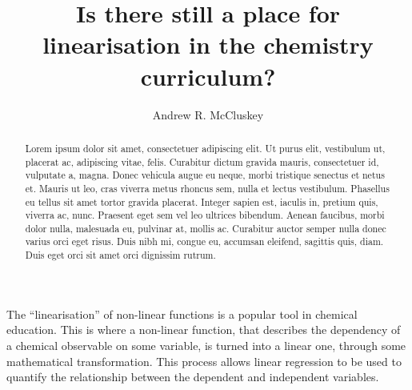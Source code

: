 \documentclass[reprint,superscriptaddress,nobibnotes,amsmath,amssymb]{revtex4-2}
\begin{document}
\title{Is there still a place for linearisation in the chemistry curriculum?}

\author{Andrew R. McCluskey}

\begin{abstract}
    Lorem ipsum dolor sit amet, consectetuer adipiscing elit.
    Ut purus elit, vestibulum ut, placerat ac, adipiscing vitae, felis.
    Curabitur dictum gravida mauris, consectetuer id, vulputate a, magna.
    Donec vehicula augue eu neque, morbi tristique senectus et netus et.
    Mauris ut leo, cras viverra metus rhoncus sem, nulla et lectus vestibulum.
    Phasellus eu tellus sit amet tortor gravida placerat.
    Integer sapien est, iaculis in, pretium quis, viverra ac, nunc.
    Praesent eget sem vel leo ultrices bibendum.
    Aenean faucibus, morbi dolor nulla, malesuada eu, pulvinar at, mollis ac.
    Curabitur auctor semper nulla donec varius orci eget risus.
    Duis nibh mi, congue eu, accumsan eleifend, sagittis quis, diam.
    Duis eget orci sit amet orci dignissim rutrum.
\end{abstract}

\maketitle 

The ``linearisation'' of non-linear functions is a popular tool in chemical education. 
This is where a non-linear function, that describes the dependency of a chemical observable on some variable, is turned into a linear one, through some mathematical transformation. 
This process allows linear regression to be used to quantify the relationship between the dependent and independent variables.
\end{document}
